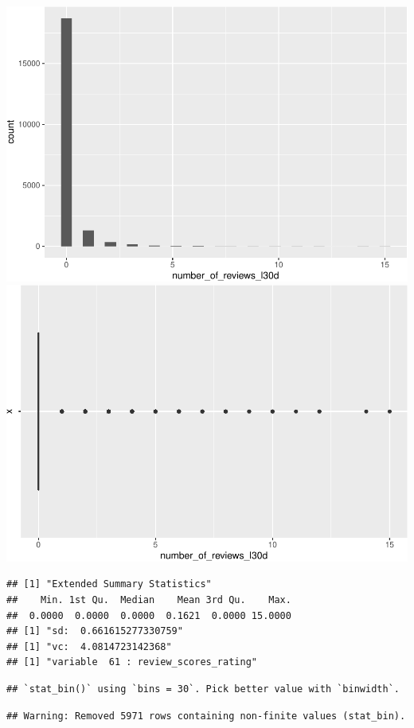 \includegraphics{anal_files/figure-latex/unnamed-chunk-9-40.pdf}
\includegraphics{anal_files/figure-latex/unnamed-chunk-9-41.pdf}

\begin{verbatim}
## [1] "Extended Summary Statistics"
##    Min. 1st Qu.  Median    Mean 3rd Qu.    Max. 
##  0.0000  0.0000  0.0000  0.1621  0.0000 15.0000 
## [1] "sd:  0.661615277330759"
## [1] "vc:  4.0814723142368"
## [1] "variable  61 : review_scores_rating"
\end{verbatim}

\begin{verbatim}
## `stat_bin()` using `bins = 30`. Pick better value with `binwidth`.
\end{verbatim}

\begin{verbatim}
## Warning: Removed 5971 rows containing non-finite values (stat_bin).
\end{verbatim}


